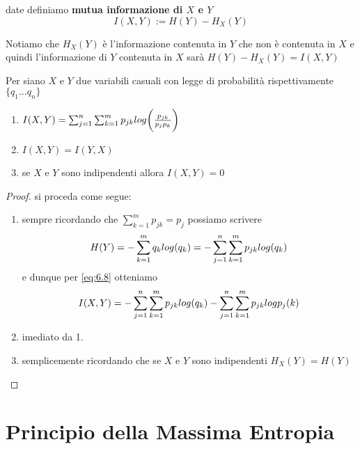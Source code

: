 \begin{defi}
date \var definiamo \textbf{mutua informazione di $X$ e $Y$}
\begin{equation} \label{defi:mutua}
I(X,Y):=H(Y)-H_X(Y)
\end{equation}
\end{defi}

Notiamo che $H_X(Y)$ è l'informazione contenuta in $Y$ che non è contenuta in $X$ e quindi l'informazione di $Y$ contenuta in $X$ sarà $H(Y)-H_X(Y)=I(X,Y)$
\begin{teo} \label{teo:6.7}
Per siano $X$ e $Y$ due variabili casuali con legge di probabilità rispettivamente \lep $\{q_1...q_n \}$
\begin{enumerate}
\item $I(X,Y)=\sum_{j=1}^n \sum_{k=1}^m p_{jk}log \bigg( \frac{p_{jk}}{p_j p_k} \bigg)$
\item $I(X,Y)=I(Y,X)$
\item se $X$ e $Y$ sono indipendenti allora $I(X,Y)=0$
\end{enumerate}
\end{teo}
\begin{proof}
si proceda come segue:
\begin{enumerate}
\item sempre ricordando che $\sum_{k=1}^m p_{jk}=p_j$ possiamo scrivere 
$$H(Y)=-\sum_{k=1}^m q_{k}log (q_k)=-\sum_{j=1}^n \sum_{k=1}^m p_{jk} log (q_k)$$
e dunque per \ref{eq:6.8} otteniamo
$$I(X,Y)=-\sum_{j=1}^n \sum_{k=1}^m p_{jk}log(q_k)-\sum_{j=1}^n \sum_{k=1}^m p_{jk}log{p_j(k)}$$
\item imediato da 1.
\item semplicemente ricordando che se $X$ e $Y$ sono indipendenti $H_X(Y)=H(Y)$
\end{enumerate}
\end{proof}


\section{Principio della Massima Entropia}
\label{sec:maxEntropia}

